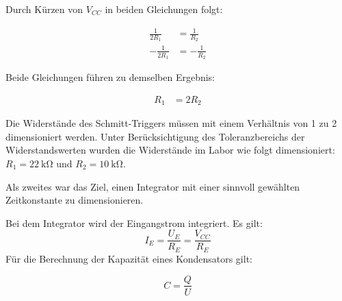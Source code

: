 Durch Kürzen von \( V_{CC} \) in beiden Gleichungen folgt:

\begin{align}
    \frac{1}{2R_1} &= \frac{1}{R_2} \\
    -\frac{1}{2R_1} &= -\frac{1}{R_2}
\end{align}

Beide Gleichungen führen zu demselben Ergebnis:

\begin{align}
    R_1 &= 2R_2
\end{align}

Die Widerstände des Schmitt-Triggers müssen mit einem Verhältnis von 1 zu 2 dimensioniert werden. Unter Berücksichtigung des Toleranzbereichs der Widerstandswerten wurden die Widerstände im Labor wie folgt dimensioniert: $R_1=\SI{22}{\kilo\ohm}$ und  $R_2=\SI{10}{\kilo\ohm}$.

Als zweites war das Ziel, einen Integrator mit einer sinnvoll gewählten Zeitkonstante zu dimensionieren.

Bei dem Integrator wird der Eingangstrom integriert.
Es gilt:
\begin{equation}
\label{eq:Integrator_I_E}
    I_E=\frac{U_E}{R_E}=\frac{V_{CC}}{R_E}
\end{equation}
Für die Berechnung der Kapazität eines Kondensators gilt:

\begin{equation}
    C= \frac{Q}{U}
\end{equation}

